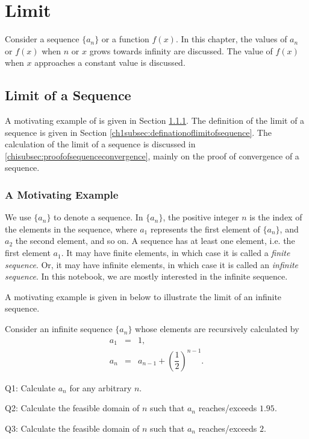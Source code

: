 \chapter{Limit} \label{ch1title}

Consider a sequence $\{a_n\}$ or a function $f(x)$. In this chapter, the values of $a_n$ or $f(x)$ when $n$ or $x$ grows towards infinity are discussed. The value of $f(x)$ when $x$ approaches a constant value is discussed.

\section{Limit of a Sequence} \label{ch1sec:limitofsequence}

A motivating example of is given in Section \ref{ch1subsec:sequencemotivatingexample}. The definition of the limit of a sequence is given in Section \ref{ch1subsec:definationoflimitofsequence}. The calculation of the limit of a sequence is discussed in \ref{chisubsec:proofofsequenceconvergence}, mainly on the proof of convergence of a sequence.

\subsection{A Motivating Example} \label{ch1subsec:sequencemotivatingexample}

We use $\{a_n\}$ to denote a sequence. In $\{a_n\}$, the positive integer $n$ is the index of the elements in the sequence, where $a_1$ represents the first element of $\{a_n\}$, and $a_2$ the second element, and so on. A sequence has at least one element, i.e. the first element $a_1$. It may have finite elements, in which case it is called a \textit{finite sequence}. Or, it may have infinite elements, in which case it is called an \textit{infinite sequence}. In this notebook, we are mostly interested in the infinite sequence.

A motivating example is given in below to illustrate the limit of an infinite sequence.

\begin{shortbox}

Consider an infinite sequence $\{a_n\}$ whose elements are recursively calculated by
\begin{eqnarray}
  a_1 &=& 1, \label{ch1eq:motivatingexampleinitialcondition} \\
  a_n &=& a_{n-1} + \left(\dfrac{1}{2}\right)^{n-1}. \label{ch1eq:motivatingexamplerecursive}
\end{eqnarray}

Q1: Calculate $a_n$ for any arbitrary $n$.

Q2: Calculate the feasible domain of $n$ such that $a_n$ reaches/exceeds $1.95$.

Q3: Calculate the feasible domain of $n$ such that $a_n$ reaches/exceeds $2$.
\end{shortbox}

